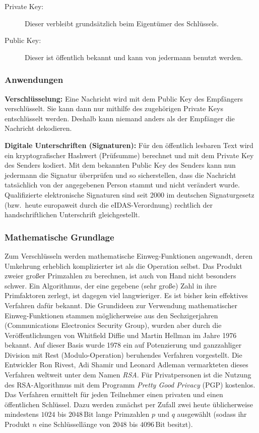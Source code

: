 \begin{description}
\item[Private Key:] Dieser verbleibt grundsätzlich beim Eigentümer des
Schlüssels.
\item[Public Key:] Dieser ist öffentlich bekannt und kann von jedermann
benutzt werden.
\end{description}

\subsubsection{Anwendungen}

\textbf{Verschlüsselung:} Eine Nachricht wird mit dem Public Key des Empfängers
verschlüsselt. Sie kann dann nur mithilfe des zugehörigen Private Keys
entschlüsselt werden. Deshalb kann niemand anders als der Empfänger die
Nachricht dekodieren.

\textbf{Digitale Unterschriften (Signaturen):} Für den öffentlich lesbaren
Text wird ein kryptografischer Hashwert (Prüfsumme) berechnet und mit dem
Private Key des Senders kodiert. Mit dem bekannten Public Key des Senders kann
nun jedermann die Signatur überprüfen und so sicherstellen, dass die Nachricht
tatsächlich von der angegebenen Person stammt und nicht verändert wurde.
Qualifizierte elektronische Signaturen sind seit 2000 im deutschen Signaturgesetz
(bzw.\ heute europaweit durch die eIDAS-Verordnung) rechtlich der
handschriftlichen Unterschrift gleichgestellt.

\subsubsection{Mathematische Grundlage}

Zum Verschlüsseln werden mathematische Einweg-Funktionen angewandt, deren
Umkehrung erheblich komplizierter ist als die Operation selbst. Das Produkt
zweier großer Primzahlen zu berechnen, ist auch von Hand nicht besonders schwer.
Ein Algorithmus, der eine gegebene (sehr große) Zahl in ihre Primfaktoren
zerlegt, ist dagegen viel langwieriger. Es ist bisher kein effektives Verfahren
dafür bekannt. Die Grundideen zur Verwendung mathematischer Einweg-Funktionen
stammen möglicherweise aus den Sechzigerjahren (Communications Electronics
Security Group), wurden aber durch die Veröffentlichungen von Whitfield Diffie
und Martin Hellman im Jahre 1976 bekannt. Auf dieser Basis wurde 1978 ein auf
Potenzierung und ganzzahliger Division mit Rest (Modulo-Operation) beruhendes
Verfahren vorgestellt. Die Entwickler Ron Rivest, Adi Shamir und Leonard
Adleman vermarkteten dieses Verfahren weltweit unter dem Namen \emph{RSA}. Für
Privatpersonen ist die Nutzung des RSA-Algorithmus mit dem Programm \emph{Pretty
Good Privacy} (PGP) kostenlos. Das Verfahren ermittelt für jeden Teilnehmer
einen privaten und einen öffentlichen Schlüssel. Dazu werden zunächst per
Zufall zwei heute üblicherweise mindestens $1024$ bis $2048\,\text{Bit}$ lange
Primzahlen $p$ und $q$ ausgewählt (sodass ihr Produkt $n$ eine Schlüssellänge
von $2048$ bis $4096\,\text{Bit}$ besitzt).

